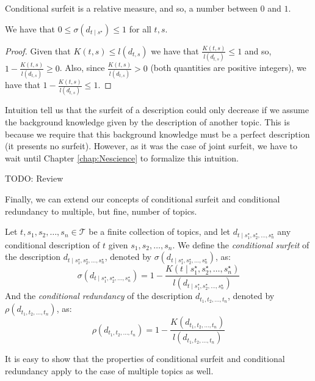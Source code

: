 Conditional surfeit is a relative measure, and so, a number between $0$ and $1$.

\begin{proposition}
We have that $0 \leq \sigma(d_{t \mid s^\star}) \leq 1$ for all $t,s$.
\end{proposition}
\begin{proof}
Given that $K(t,s) \leq l(d_{t,s})$ we have that $\frac{K(t, s)}{l \left( d_{t,s} \right)} \leq 1$ and so, $1 - \frac{K(t, s)}{l \left( d_{t,s} \right)} \geq 0$. Also, since $\frac{K(t, s)}{l \left( d_{t,s} \right)} > 0$ (both quantities are positive integers), we have that $1 - \frac{K(t, s)}{l \left( d_{t,s} \right)} \leq 1$.
\end{proof}

Intuition tell us that the surfeit of a description could only decrease if we assume the background knowledge given by the description of another topic. This is because we require that this background knowledge must be a perfect description (it presents no surfeit). However, as it was the case of joint surfeit, we have to wait until Chapter \ref{chap:Nescience} to formalize this intuition.

{\color{red} TODO: Review}

Finally, we can extend our concepts of conditional surfeit and conditional redundancy to multiple, but fine, number of topics.

\begin{definition}
Let $t, s_1, s_2, \ldots, s_n \in \mathcal{T}$ be a finite collection of topics, and let $d_{t \mid s_1^\star, s_2^\star, \ldots,s_n^\star}$ any conditional description of $t$ given $s_1, s_2, \ldots, s_n$. We define the \emph{conditional surfeit} of the description $d_{t \mid s_1^\star, s_2^\star, \ldots,s_n^\star}$, denoted by $\sigma(d_{t \mid s_1^\star, s_2^\star, \ldots,s_n^\star})$, as: 
\[
\sigma(d_{t \mid s_1^\star, s_2^\star, \ldots,s_n^\star}) = 1 - \frac{K\left( t \mid s_1^\star, s_2^\star, \ldots,s_n^\star \right)}{l \left( d_{t \mid s_1^\star, s_2^\star, \ldots,s_n^\star} \right)}
\]
And the \emph{conditional redundancy} of the description $d_{t_1, t_2, \ldots, t_n}$, denoted by $\rho(d_{t_1, t_2, \ldots, t_n})$, as:
\[
\rho(d_{t_1, t_2, \ldots, t_n}) = 1 - \frac{K(d_{t_1, t_2, \ldots, t_n})}{l \left( d_{t_1, t_2, \ldots, t_n} \right)}
\]
\end{definition}

It is easy to show that the properties of conditional surfeit and conditional redundancy apply to the case of multiple topics as well.

